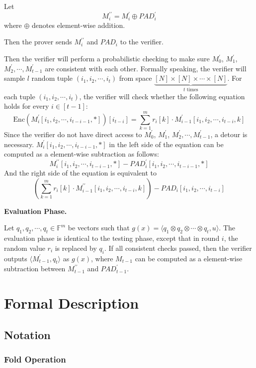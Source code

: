 Let 
$$
M_i^{\prime\prime} = M_i^{\prime} \oplus PAD_i^\prime
$$
where $\oplus$ denotes element-wise addition.

Then the prover sends $M_i^{\prime\prime}$ and $PAD_i$ to the verifier.

Then the verifier will perform a probabilistic checking to make sure 
$M_0^\prime$, $M_1^\prime$, $M_2^\prime, \cdots, M_{t-1}^\prime$ 
are consistent with each other. Formally speaking, the verifier will sample $l$ random tuple $(i_1, i_2, \cdots, i_t)$ from space $\underbrace{[N] \times [N] \times \cdots \times [N]}_{t \text{ times}}$. 
For each tuple $(i_1, i_2, \cdots, i_t)$,
the verifier will check whether the following equation holds for every $i \in [t-1]$:
$$
    \text{Enc}(M_i^\prime[i_1, i_2, \cdots, i_{t-i-1}, *])[i_{t-i}] = \sum_{k=1}^m r_i[k] \cdot M_{i-1}^{\prime}[i_1,i_2, \cdots, i_{t-i},k]
$$
Since the verifier do not have direct access to $M_0^\prime$, $M_1^\prime$, $M_2^\prime, \cdots, M_{t-1}^\prime$, a detour is necessary. $M_i^\prime[i_1, i_2, \cdots, i_{t-i-1}, *]$ in the left side of the equation can be computed as a element-wise subtraction as follows:
$$
    M_i^{\prime\prime}[i_1, i_2, \cdots, i_{t-i-1}, *] - PAD_i^\prime[i_1, i_2, \cdots, i_{t-i-1}, *]
$$
And the right side of the equation is equivalent to 
$$
    (\sum_{k=1}^m r_i[k] \cdot M_{i-1}^{\prime\prime}[i_1,i_2, \cdots, i_{t-i},k]) - PAD_i[i_1, i_2, \cdots, i_{t-i}]
$$

\textbf{Evaluation Phase.}

Let $q_1, q_2, \cdots, q_t \in \mathbb{F}^{m}$ be vectors such that $g(x) =\langle q_1 \otimes q_2 \otimes \cdots \otimes q_t, u \rangle $. The evaluation phase is identical to the testing phase, except that in round $i$, the random value $r_i$ is replaced by $q_i$. If all consistent checks passed, then the verifier outputs $\langle M_{t-1}^{\prime}, q_t \rangle$ as $g(x)$, where $M_{t-1}$ can be computed as a element-wise subtraction between $M_{t-1}^{\prime\prime}$ and $PAD_{t-1}^\prime$.

\section{Formal Description}

\subsection{Notation}

\subsubsection{Fold Operation}

